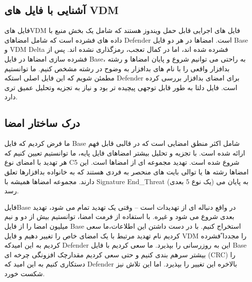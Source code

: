 \documentclass{ISCISC2020}
\begin{document}
\subsection{آشنایی با فایل های VDM}
فایل هایVDM فایل های اجرایی قابل حمل ویندوز هستند که شامل یک بخش منبع با داده های فشرده است که 
شامل امضاهای Defender است. امضاها در هر دو فایل Base و VDM Delta فشرده شده اند، اما در کمال تعجب، 
رمزگذاری نشده اند. پس از فشرده سازی امضاها در فایل Base، به راحتی می توانیم شروع و پایان امضاها و رشته 
بدافزار واقعی را با نام های بدافزار به وضوح در رشته مشخص کنیم. ما توانستیم مطمئن شویم که این فایل اصلی 
استکه Defender برای امضای بدافزار بررسی کرده است. فایل دلتا به طور قابل توجهی پیچیده تر بود و نیاز به تجزیه 
وتحلیل عمیق تری دارد.



\subsection{درک ساختار امضا}
ما فرض کردیم که فایل Base شامل اکثر منطق امضایی است که در قالبی قابل فهم ارائه شده است. با تجزیه و 
تحلیل بیشتر امضاهای فایل پایه، ما توانستیم تعیین کنیم که هر تهدید با امضای نوع C5 شروع شده است. تهدید 
مجموعه ای از امضاها است. این امضاها رشته ها یا توالی بایت های منحصر به فردی هستند که به خانواده بدافزارها 
تعلق دارند. مجموعه امضاها همیشه با Signature End\_Threat (یک نوع 5 بعدی) به پایان می رسد.


فایلBase در واقع دنباله ای از تهدیدات است – وقتی یک تهدید تمام می شود، تهدید بعدی شروع می شود و غیره. با 
استفاده از فرمت امضا، توانستیم بیش از دو و نیم میلیون امضا را از فایل Base استخراج کنیم. با در دست داشتن این 
اطلاعات،ما سعی کردیم نام تهدید مرتبط با یک امضای خاص را تغییر دهیم و فایل VDM را مجددا ًفشرده کردیم به این 
امیدکه Defender این به روزرسانی را بپذیرد. ما سعی کردیم با فایل Base بیشتر سرهم بندی کنیم و حتی سعی کردیم 
مقدارچک افزونگی چرخه ای (CRC) را دستکاری کنیم به این امید که Defender بالاخره این تغییر را بپذیرد. اما این 
تلاش نیز شکست خورد.
\end{document}
